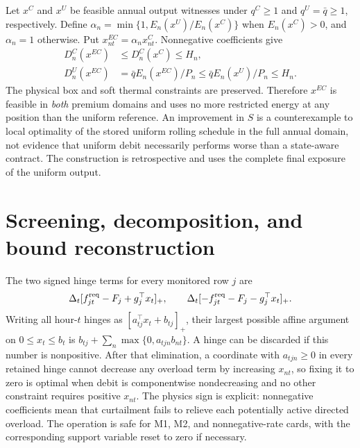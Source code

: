 \documentclass[11pt]{article}
\begin{document}
Let $x^C$ and $x^U$ be feasible annual output witnesses under $q^C\geq1$ and $q^U=\bar q\geq1$, respectively. Define $\alpha_n=\min\{1,E_n(x^U)/E_n(x^C)\}$ when $E_n(x^C)>0$, and $\alpha_n=1$ otherwise. Put $x^{EC}_{nt}=\alpha_nx^C_{nt}$. Nonnegative coefficients give
\begin{align}
 D_n^C(x^{EC})&\leq D_n^C(x^C)\leq H_n,\\
 D_n^U(x^{EC})&=\bar qE_n(x^{EC})/P_n\leq\bar qE_n(x^U)/P_n\leq H_n.
\end{align}
The physical box and soft thermal constraints are preserved. Therefore $x^{EC}$ is feasible in \emph{both} premium domains and uses no more restricted energy at any position than the uniform reference. An improvement in $S$ is a counterexample to local optimality of the stored uniform rolling schedule in the full annual domain, not evidence that uniform debit necessarily performs worse than a state-aware contract. The construction is retrospective and uses the complete final exposure of the uniform output.

\section{Screening, decomposition, and bound reconstruction}
The two signed hinge terms for every monitored row $j$ are
\begin{equation}
 \Delta_t[f_{jt}^{\rm req}-F_j+g_j^\top x_t]_+,
 \qquad\Delta_t[-f_{jt}^{\rm req}-F_j-g_j^\top x_t]_+.
\end{equation}
Writing all hour-$t$ hinges as $[a_{tj}^\top x_t+b_{tj}]_+$, their largest possible affine argument on $0\leq x_t\leq b_t$ is $b_{tj}+\sum_n\max\{0,a_{tjn}b_{nt}\}$. A hinge can be discarded if this number is nonpositive. After that elimination, a coordinate with $a_{tjn}\geq0$ in every retained hinge cannot decrease any overload term by increasing $x_{nt}$, so fixing it to zero is optimal when debit is componentwise nondecreasing and no other constraint requires positive $x_{nt}$. The physics sign is explicit: nonnegative coefficients mean that curtailment fails to relieve each potentially active directed overload. The operation is safe for M1, M2, and nonnegative-rate cards, with the corresponding support variable reset to zero if necessary.
\end{document}
